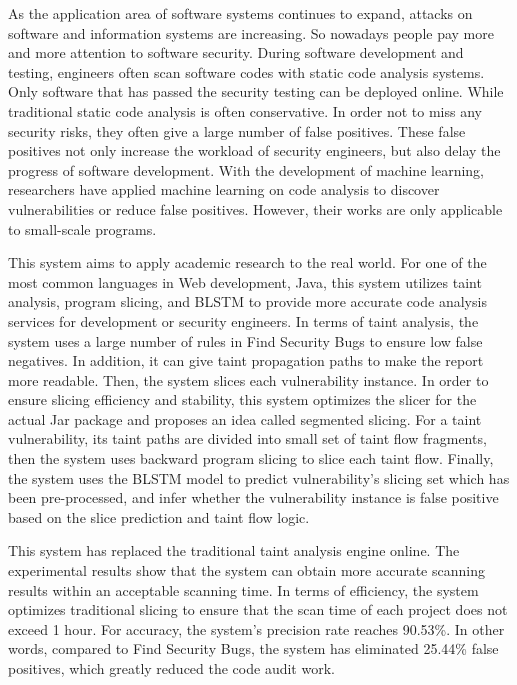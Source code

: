 \documentclass[master]{NJUthesis}
\theoremstyle{plain}
\begin{document}
\begin{englishabstract}
    
As the application area of software systems continues to expand, attacks on software and information systems are increasing. So nowadays people pay more and more attention to software security. During software development and testing, engineers often scan software codes with static code analysis systems. Only software that has passed the security testing can be deployed online. While traditional static code analysis is often conservative. In order not to miss any security risks, they often give a large number of false positives. These false positives not only increase the workload of security engineers, but also delay the progress of software development. With the development of machine learning, researchers have applied machine learning on code analysis to discover vulnerabilities or reduce false positives. However, their works are only applicable to small-scale programs. 

This system aims to apply academic research to the real world. For one of the most common languages in Web development, Java, this system utilizes taint analysis, program slicing, and BLSTM to provide more accurate code analysis services for development or security engineers. In terms of taint analysis, the system uses a large number of rules in Find Security Bugs to ensure low false negatives. In addition, it can give taint propagation paths to make the report more readable. Then, the system slices each vulnerability instance. In order to ensure slicing efficiency and stability, this system optimizes the slicer for the actual Jar package and proposes an idea called ​​segmented slicing. For a taint vulnerability, its taint paths are divided into small set of taint flow fragments, then the system uses backward program slicing to slice each taint flow. Finally, the system uses the BLSTM model to predict vulnerability's slicing set which has been pre-processed, and infer whether the vulnerability instance is false positive based on the slice prediction and taint flow logic.

This system has replaced the traditional taint analysis engine online. The experimental results show that the system can obtain more accurate scanning results within an acceptable scanning time. In terms of efficiency, the system optimizes traditional slicing to ensure that the scan time of each project does not exceed 1 hour. For accuracy,  the system's precision rate reaches 90.53\%. In other words, compared to Find Security Bugs, the system has eliminated 25.44\% false positives, which greatly reduced the code audit work.

\end{englishabstract}
\end{document}
